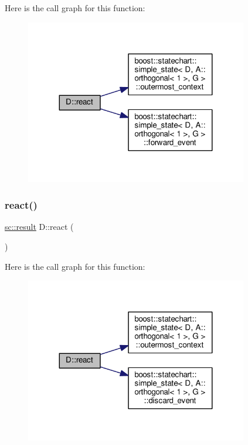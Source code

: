 Here is the call graph for this function\+:
\nopagebreak
\begin{figure}[H]
\begin{center}
\leavevmode
\includegraphics[width=275pt]{struct_d_a975ef2b8a62e2b68e9af3640aa8d99b9_cgraph}
\end{center}
\end{figure}
\mbox{\label{struct_d_a34f2b339213d50b9b7b56389068d7140}} 
\subsubsection{\texorpdfstring{react()}{react()}\hspace{0.1cm}{\footnotesize\ttfamily [3/3]}}
{\footnotesize\ttfamily \mbox{\hyperlink{namespaceboost_1_1statechart_abe807f6598b614d6d87bb951ecd92331}{sc\+::result}} D\+::react (\begin{DoxyParamCaption}\item[{const \mbox{\hyperlink{struct_ev_discard_in_d}{Ev\+Discard\+InD}} \&}]{ }\end{DoxyParamCaption})\hspace{0.3cm}{\ttfamily [inline]}}

Here is the call graph for this function\+:
\nopagebreak
\begin{figure}[H]
\begin{center}
\leavevmode
\includegraphics[width=275pt]{struct_d_a34f2b339213d50b9b7b56389068d7140_cgraph}
\end{center}
\end{figure}


